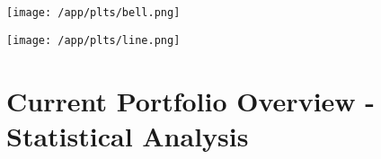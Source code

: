 \documentclass{article}
\begin{document}
\vspace{.4cm}
\begin{center}


\hspace*{-1cm}\texttt{[image: /app/plts/bell.png]}\par

\vspace{.5cm}

\hspace*{-1cm}\texttt{[image: /app/plts/line.png]}\par
\end{center}

\newpage

\section{Current Portfolio Overview - Statistical Analysis}

\vspace{1.5cm}

\end{document}
